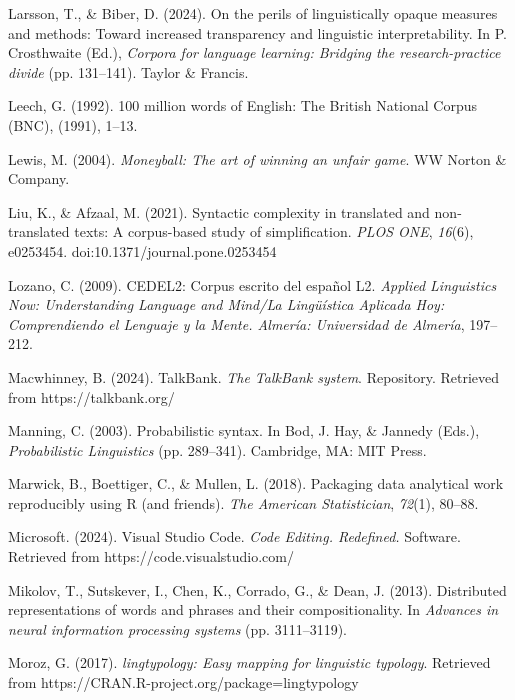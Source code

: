 \documentclass[
  letterpaper,
  krantz1]{latex/krantz-mod}
\newlength{\cslhangindent}
\newenvironment{CSLReferences}[2] %
 {\begin{list}{}{%
  \setlength{\itemindent}{0pt}
  \setlength{\leftmargin}{0pt}
  \setlength{\parsep}{0pt}
  \ifodd #1
   \setlength{\leftmargin}{\cslhangindent}
   \setlength{\itemindent}{-1\cslhangindent}
  \fi
  \setlength{\itemsep}{#2\baselineskip}}}
 {\end{list}}
\theoremstyle{definition}
\theoremstyle{definition}
\theoremstyle{remark}
\begin{document}
\begin{CSLReferences}{1}{0}
Larsson, T., \& Biber, D. (2024). On the perils of linguistically opaque
measures and methods: {Toward} increased transparency and linguistic
interpretability. In P. Crosthwaite (Ed.), \emph{Corpora for language
learning: {Bridging} the research-practice divide} (pp. 131--141).
Taylor \& Francis.

Leech, G. (1992). 100 million words of {English}: {The British National
Corpus} ({BNC}), (1991), 1--13.

Lewis, M. (2004). \emph{Moneyball: {The} art of winning an unfair game}.
WW Norton \& Company.

Liu, K., \& Afzaal, M. (2021). Syntactic complexity in translated and
non-translated texts: A corpus-based study of simplification. \emph{PLOS
ONE}, \emph{16}(6), e0253454. doi:10.1371/journal.pone.0253454

Lozano, C. (2009). {CEDEL2}: {Corpus} escrito del espa{ñ}ol {L2}.
\emph{Applied Linguistics Now: Understanding Language and Mind/La
Ling{ü}{í}stica Aplicada Hoy: Comprendiendo el Lenguaje y la Mente.
Almer{í}a: Universidad de Almer{í}a}, 197--212.

Macwhinney, B. (2024). {TalkBank}. \emph{The TalkBank system}.
Repository. Retrieved from https://talkbank.org/

Manning, C. (2003). Probabilistic syntax. In Bod, J. Hay, \& Jannedy
(Eds.), \emph{Probabilistic {Linguistics}} (pp. 289--341). Cambridge,
MA: MIT Press.

Marwick, B., Boettiger, C., \& Mullen, L. (2018). Packaging data
analytical work reproducibly using {R} (and friends). \emph{The American
Statistician}, \emph{72}(1), 80--88.

Microsoft. (2024). Visual {Studio Code}. \emph{Code Editing. Redefined.}
Software. Retrieved from https://code.visualstudio.com/

Mikolov, T., Sutskever, I., Chen, K., Corrado, G., \& Dean, J. (2013).
Distributed representations of words and phrases and their
compositionality. In \emph{Advances in neural information processing
systems} (pp. 3111--3119).

Moroz, G. (2017). \emph{{lingtypology}: Easy mapping for linguistic
typology}. Retrieved from
https://CRAN.R-project.org/package=lingtypology


\end{CSLReferences}
\end{document}
